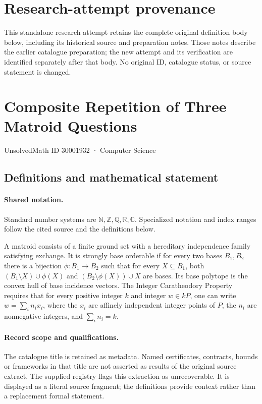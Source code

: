 \documentclass[11pt]{article}
\begin{document}
\section*{Research-attempt provenance}
This standalone research attempt retains the complete original definition body below,
including its historical source and preparation notes. Those notes describe the
earlier catalogue preparation; the new attempt and its verification are identified
separately after that body. No original ID, catalogue status, or source statement is changed.

\section{Composite Repetition of Three Matroid Questions}\label{30001932}
{\small UnsolvedMath ID 30001932 · Computer Science}
\subsection{Definitions and mathematical statement}

\paragraph{Shared notation.}Standard number systems are $\mathbb N,\mathbb Z,\mathbb Q,\mathbb R,\mathbb C$. Specialized notation and index ranges follow the cited source and the definitions below.


A matroid consists of a finite ground set with a hereditary independence family satisfying exchange. It is strongly base orderable if for every two bases $B_1,B_2$ there is a bijection $\phi:B_1\to B_2$ such that for every $X\subseteq B_1$, both $(B_1\setminus X)\cup\phi(X)$ and $(B_2\setminus\phi(X))\cup X$ are bases. Its base polytope is the convex hull of base incidence vectors. The Integer Caratheodory Property requires that for every positive integer $k$ and integer $w\in kP$, one can write $w=\sum_i n_ix_i$, where the $x_i$ are affinely independent integer points of $P$, the $n_i$ are nonnegative integers, and $\sum_i n_i=k$.
\paragraph{Record scope and qualifications.}
The catalogue title is retained as metadata. Named certificates, contracts, bounds or frameworks in that title are not asserted as results of the original source extract.
The supplied registry flags this extraction as unrecoverable. It is displayed as a literal source fragment; the definitions provide context rather than a replacement formal statement.
\end{document}
